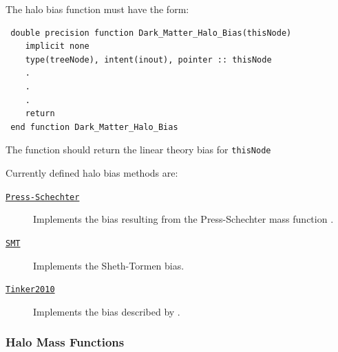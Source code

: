 The halo bias function must have the form:
\begin{verbatim}
 double precision function Dark_Matter_Halo_Bias(thisNode)
    implicit none
    type(treeNode), intent(inout), pointer :: thisNode
    .
    .
    .
    return
 end function Dark_Matter_Halo_Bias
\end{verbatim}
The function should return the linear theory bias for {\tt thisNode}

Currently defined halo bias methods are:
\begin{description}
 \item [\hyperlink{structure_formation.CDM.halo_bias.Press-Schechter.F90:dark_matter_halo_biases_press_schechter:dark_matter_halo_bias_press_schechter}{{\tt Press-Schechter}}] Implements the bias resulting from the Press-Schechter \citep{press_formation_1974} mass function \citep{mo_analytic_1996}.
 \item [\hyperlink{structure_formation.CDM.halo_bias.SMT.F90:dark_matter_halo_biases_smt:dark_matter_halo_bias_smt}{{\tt SMT}}] Implements the Sheth-Tormen \citep{sheth_ellipsoidal_2001} bias.
 \item [\hyperlink{structure_formation.CDM.halo_bias.Tinker2010.F90:dark_matter_halo_biases_tinker2010:dark_matter_halo_bias_tinker2010}{{\tt Tinker2010}}] Implements the bias described by \cite{tinker_large_2010}.
\end{description}

\subsubsection{Halo Mass Functions}

